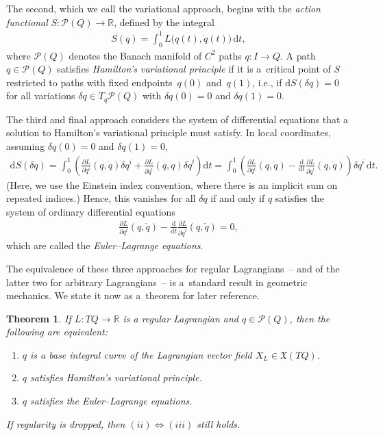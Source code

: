 \documentclass[pdftex]{sigma}
\numberwithin{equation}{section}
\newtheorem{Theorem}{Theorem}[section]
\begin{document}
The second, which we call the variational approach, begins with the \emph{action functional} $ S \colon \mathcal{P} (Q) \rightarrow \mathbb{R} $, def\/ined by the integral
\begin{gather*}
 S (q) = \int _0 ^1 L \bigl( q (t) , \dot{q} (t) \bigr) \,\mathrm{d}t ,
\end{gather*}
where $ \mathcal{P} (Q) $ denotes the Banach manifold of $ C ^2 $ paths $ q \colon I \rightarrow Q $. A path $q \in \mathcal{P} (Q) $ satisf\/ies \emph{Hamilton's variational principle} if it is a~critical point of $S$ restricted to paths with f\/ixed endpoints~$ q (0) $ and~$ q (1) $, i.e., if $ \mathrm{d} S (\delta q) = 0 $ for all variations $ \delta q \in T _q \mathcal{P} (Q) $ with $ \delta q (0) = 0 $ and $ \delta q (1) = 0 $.

The third and f\/inal approach considers the system of dif\/ferential equations that a solution to Hamilton's variational principle must satisfy. In local coordinates, assuming $ \delta q (0) = 0 $ and $ \delta q (1) = 0 $,
\begin{gather*}
 \mathrm{d} S ( \delta q ) = \int _0 ^1 \left( \frac{ \partial L }{ \partial q ^i } ( q, \dot{q} ) \delta q ^i + \frac{ \partial L }{ \partial \dot{q} ^i } ( q , \dot{q} ) \delta \dot{q} ^i \right) \mathrm{d}t
 = \int _0 ^1 \left( \frac{ \partial L }{ \partial q ^i } ( q, \dot{q} ) - \frac{\mathrm{d}}{\mathrm{d}t} \frac{ \partial L }{ \partial \dot{q}
 ^i } ( q, \dot{q} ) \right) \delta q ^i \,\mathrm{d}t .
\end{gather*}
(Here, we use the Einstein index convention, where there is an implicit sum on repeated indices.) Hence, this vanishes for all $ \delta q $ if and only if $q$ satisf\/ies the system of ordinary dif\/ferential equations
\begin{gather*}
 \frac{ \partial L }{ \partial q ^i } ( q, \dot{q} ) - \frac{\mathrm{d}}{\mathrm{d}t} \frac{ \partial L }{ \partial \dot{q} ^i } ( q, \dot{q} ) = 0,
\end{gather*}
which are called the \emph{Euler--Lagrange equations}.

The equivalence of these three approaches for regular Lagrangians~-- and of the latter two for arbitrary Lagrangians~-- is a~standard result in geometric mechanics. We state it now as a~theorem for later reference.

\begin{Theorem}\label{thm:lagrangian} If $ L \colon T Q \rightarrow \mathbb{R} $ is a regular Lagrangian and $ q \in \mathcal{P} (Q) $, then the following are equivalent:
\begin{enumerate}[label={\rm (\roman*)}]\itemsep=0pt
\item $q$ is a base integral curve of the Lagrangian vector field $ X _L \in \mathfrak{X} ( T Q ) $.

\item $q$ satisfies Hamilton's variational principle.

\item $q$ satisfies the Euler--Lagrange equations.
\end{enumerate}
 If regularity is dropped, then $(ii)\Leftrightarrow (iii)$ still holds.
\end{Theorem}
\end{document}
